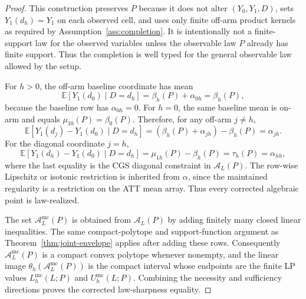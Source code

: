\documentclass[11pt]{article}
\newcommand{\E}{\mathbb{E}}
\theoremstyle{definition}
\theoremstyle{plain}
\theoremstyle{remark}
\begin{document}
\begin{proof}
This construction preserves \(P\) because it does not alter
\((Y_0,Y_1,D)\), sets \(Y_1(d_h)=Y_1\) on each observed cell, and uses only
finite off-arm product kernels as required by Assumption~\ref{ass:completion}.
It is intentionally not a finite-support law for the observed variables unless
the observable law \(P\) already has finite support.  Thus the completion is
well typed for the general observable law allowed by the setup.

For \(h>0\), the off-arm baseline coordinate has mean
\[
  \E[Y_1(d_0)\mid D=d_h]=\beta_h(P)+\alpha_{0h}=\beta_h(P),
\]
because the baseline row has \(\alpha_{0h}=0\).  For \(h=0\), the same baseline
mean is on-arm and equals \(\mu_{10}(P)=\beta_0(P)\).  Therefore, for any
off-arm \(j\ne h\),
\[
  \E[Y_1(d_j)-Y_1(d_0)\mid D=d_h]
  =
  (\beta_h(P)+\alpha_{jh})-\beta_h(P)
  =
  \alpha_{jh}.
\]
For the diagonal coordinate \(j=h\),
\[
  \E[Y_1(d_h)-Y_1(d_0)\mid D=d_h]
  =
  \mu_{1h}(P)-\beta_h(P)
  =
  \tau_h(P)
  =
  \alpha_{hh},
\]
where the last equality is the CGS diagonal constraint in \(\mathcal A_L(P)\).
The row-wise Lipschitz or isotonic restriction is inherited from \(\alpha\),
since the maintained regularity is a restriction on the ATT mean array.  Thus
every corrected algebraic point is law-realized.

The set \(\mathcal A_L^{\mathrm{mc}}(P)\) is obtained from
\(\mathcal A_L(P)\) by adding finitely many closed linear inequalities.
The same compact-polytope and support-function argument as
Theorem~\ref{thm:joint-envelope} applies after adding these rows.  Consequently
\(\mathcal A_L^{\mathrm{mc}}(P)\) is a compact convex polytope whenever
nonempty, and the linear image
\(\theta_h(\mathcal A_L^{\mathrm{mc}}(P))\) is the compact interval whose
endpoints are the finite LP values
\(L_h^{\mathrm{mc}}(L;P)\) and \(U_h^{\mathrm{mc}}(L;P)\).  Combining the
necessity and sufficiency directions proves the corrected law-sharpness
equality.
\end{proof}
\end{document}
